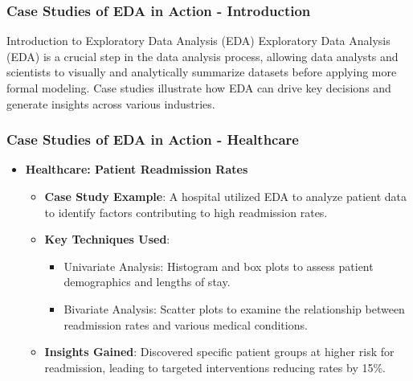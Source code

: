 \documentclass[aspectratio=169]{beamer}
\begin{document}
\begin{frame}[fragile]
    \frametitle{Case Studies of EDA in Action - Introduction}
    \begin{block}{Introduction to Exploratory Data Analysis (EDA)}
        Exploratory Data Analysis (EDA) is a crucial step in the data analysis process, allowing data analysts and scientists to visually and analytically summarize datasets before applying more formal modeling. 
        Case studies illustrate how EDA can drive key decisions and generate insights across various industries.
    \end{block}
\end{frame}

\begin{frame}[fragile]
    \frametitle{Case Studies of EDA in Action - Healthcare}
    \begin{itemize}
        \item \textbf{Healthcare: Patient Readmission Rates}
            \begin{itemize}
                \item \textbf{Case Study Example}: A hospital utilized EDA to analyze patient data to identify factors contributing to high readmission rates.
                \item \textbf{Key Techniques Used}:
                    \begin{itemize}
                        \item Univariate Analysis: Histogram and box plots to assess patient demographics and lengths of stay.
                        \item Bivariate Analysis: Scatter plots to examine the relationship between readmission rates and various medical conditions.
                    \end{itemize}
                \item \textbf{Insights Gained}: Discovered specific patient groups at higher risk for readmission, leading to targeted interventions reducing rates by 15\%.
            \end{itemize}
    \end{itemize}
\end{frame}
\end{document}
